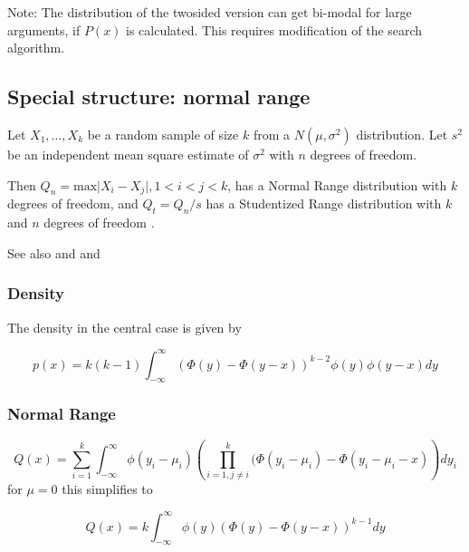 Note: The distribution of the twosided version can get bi-modal for large arguments, if $P(x)$ is calculated. This requires modification of the search algorithm.


\subsection{Special structure: normal range}

Let $X_1, \dots, X_k$ be a random sample of size $k$ from a  $N(\mu, \sigma^2)$ distribution. Let $s^2$ be an independent mean square estimate of $\sigma^2$ with $n$ degrees of freedom.

Then $Q_n = \text{max} \vert X_i - X_j \vert, 1<i<j<k$, has a Normal Range distribution with $k$ degrees of freedom, and 
$Q_t = Q_n / s$ has a Studentized Range distribution with $k$ and $n$ degrees of freedom \cite{Hochberg_1987}.

See also \cite{Stoline_1978} and \cite{Harter_1960} and \cite{David_1972}

\subsubsection{Density}
\label{NormalRangeDistributionDensity}

The density in the central case is given by

\begin{equation}
	p(x) = k(k-1)  \int_{-\infty}^\infty \left( \Phi(y) - \Phi(y-x) \right)^{k-2} \phi(y) \phi(y-x) dy
\end{equation}


\subsubsection{Normal Range}

\begin{equation}
	Q(x) = \sum_{i=1}^k  \int_{-\infty}^\infty \phi(y_i - \mu_i) \left( \prod_{i=1, j \neq i}^k (\Phi(y_i - \mu_i) - \Phi(y_i - \mu_i -x) \right) dy_i
\end{equation}
for $\mu=0$ this simplifies to

\begin{equation}
	Q(x) = k  \int_{-\infty}^\infty \phi(y) \left( \Phi(y) - \Phi(y-x) \right)^{k-1} dy
\end{equation}

